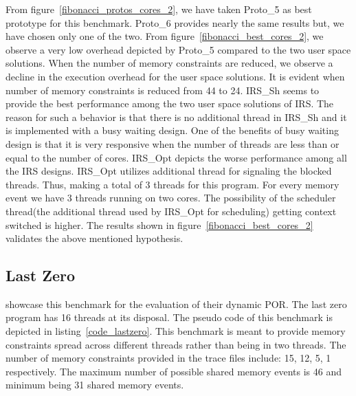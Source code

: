 From figure~\ref{fibonacci_protos_cores_2}, we have taken Proto\_5 as best prototype for this benchmark. 
Proto\_6 provides nearly the same results but, we have chosen only one of the two. 
From figure~\ref{fibonacci_best_cores_2}, we observe a very low overhead depicted by Proto\_5 compared to the two user space solutions. 
When the number of memory constraints are reduced, we observe a decline in the execution overhead for the user space solutions. 
It is evident when number of memory constraints is reduced from 44 to 24. 
IRS\_Sh seems to provide the best performance among the two user space solutions of IRS. 
The reason for such a behavior is that there is no additional thread in IRS\_Sh and it is implemented with a busy waiting design. 
One of the benefits of busy waiting design is that it is very responsive when the number of threads are less than or equal to the number of cores. 
IRS\_Opt depicts the worse performance among all the IRS designs. 
IRS\_Opt utilizes additional thread for signaling the blocked threads. Thus, making a total of 3 threads for this program. 
For every memory event we have 3 threads running on two cores. 
The possibility of the scheduler thread(the additional thread used by IRS\_Opt for scheduling) getting context switched is higher. 
The results shown in figure~\ref{fibonacci_best_cores_2} validates the above mentioned hypothesis.


\subsection{Last Zero}

\citet{abdulla2014optimal} showcase this benchmark for the evaluation of their dynamic POR. 
The last zero program has 16 threads at its disposal. 
The pseudo code of this benchmark is depicted in listing~\ref{code_lastzero}. 
This benchmark is meant to provide memory constraints spread across different threads rather than being in two threads. 
The number of memory constraints provided in the trace files include: 15, 12, 5, 1 respectively. 
The maximum number of possible shared memory events is 46 and minimum being 31 shared memory events.

